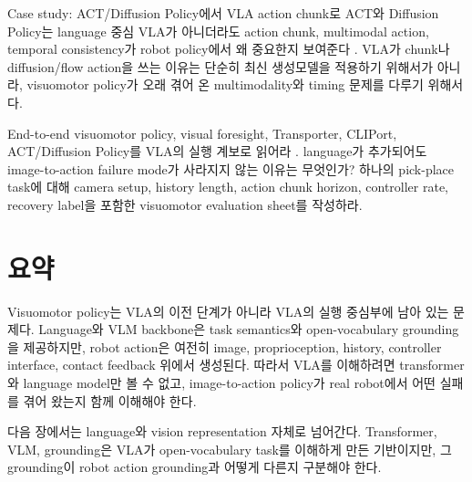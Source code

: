 \begin{casebox}{Case study: ACT/Diffusion Policy에서 VLA action chunk로}
ACT와 Diffusion Policy는 language 중심 VLA가 아니더라도 action chunk, multimodal action, temporal consistency가 robot policy에서 왜 중요한지 보여준다 \cite{act2023,diffusionpolicy2023}. VLA가 chunk나 diffusion/flow action을 쓰는 이유는 단순히 최신 생성모델을 적용하기 위해서가 아니라, visuomotor policy가 오래 겪어 온 multimodality와 timing 문제를 다루기 위해서다.
\end{casebox}

\chapterwork
{End-to-end visuomotor policy, visual foresight, Transporter, CLIPort, ACT/Diffusion Policy를 VLA의 실행 계보로 읽어라 \cite{levine2016gps,ebert2018visualforesight,florence2021transporter,cliport2022,act2023,diffusionpolicy2023}.}
{language가 추가되어도 image-to-action failure mode가 사라지지 않는 이유는 무엇인가?}
{하나의 pick-place task에 대해 camera setup, history length, action chunk horizon, controller rate, recovery label을 포함한 visuomotor evaluation sheet를 작성하라.}

\section{요약}

Visuomotor policy는 VLA의 이전 단계가 아니라 VLA의 실행 중심부에 남아 있는 문제다. Language와 VLM backbone은 task semantics와 open-vocabulary grounding을 제공하지만, robot action은 여전히 image, proprioception, history, controller interface, contact feedback 위에서 생성된다. 따라서 VLA를 이해하려면 transformer와 language model만 볼 수 없고, image-to-action policy가 real robot에서 어떤 실패를 겪어 왔는지 함께 이해해야 한다.

다음 장에서는 language와 vision representation 자체로 넘어간다. Transformer, VLM, grounding은 VLA가 open-vocabulary task를 이해하게 만든 기반이지만, 그 grounding이 robot action grounding과 어떻게 다른지 구분해야 한다.
